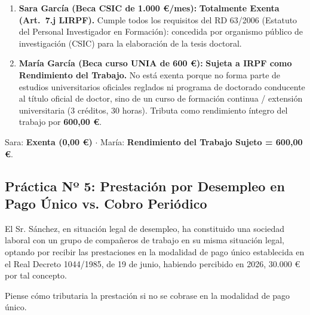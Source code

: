 \documentclass[11pt,a4paper,openany]{article}
\begin{document}
\begin{solucionBox}
\begin{enumerate}
    \item \textbf{Sara García (Beca CSIC de 1.000 \euro/mes):} \textbf{Totalmente Exenta (Art.~7.j LIRPF).}
    Cumple todos los requisitos del RD 63/2006 (Estatuto del Personal Investigador en Formación): concedida por organismo público de investigación (CSIC) para la elaboración de la tesis doctoral.
    
    \item \textbf{María García (Beca curso UNIA de 600 \euro):} \textbf{Sujeta a IRPF como Rendimiento del Trabajo.}
    No está exenta porque no forma parte de estudios universitarios oficiales reglados ni programa de doctorado conducente al título oficial de doctor, sino de un curso de formación continua / extensión universitaria (3 créditos, 30 horas). Tributa como rendimiento íntegro del trabajo por \textbf{600,00 \euro}.
\end{enumerate}
\end{solucionBox}

\begin{resultadoBox}[Resultados]
Sara: \textbf{Exenta (0,00 \euro)} $\cdot$ María: \textbf{Rendimiento del Trabajo Sujeto = 600,00 \euro}.
\end{resultadoBox}

\vspace{0.4cm}

\subsection{Práctica Nº 5: Prestación por Desempleo en Pago Único vs. Cobro Periódico}

\begin{enunciadoBox}
El Sr. Sánchez, en situación legal de desempleo, ha constituido una sociedad laboral con un grupo de compañeros de trabajo en su misma situación legal, optando por recibir las prestaciones en la modalidad de pago único establecida en el Real Decreto 1044/1985, de 19 de junio, habiendo percibido en 2026, 30.000 \euro{} por tal concepto.

Piense cómo tributaria la prestación si no se cobrase en la modalidad de pago único.
\end{enunciadoBox}
\end{document}
